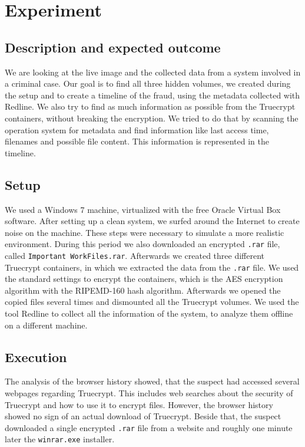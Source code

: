 \section{Experiment}
\subsection{Description and expected outcome}
We are looking at the live image and the collected data from a system involved in a criminal case. 
Our goal is to find all three hidden volumes, we created during the setup and to create a timeline of the fraud, using the metadata collected with Redline. 
We also try to find as much information as possible from the Truecrypt containers, without breaking the encryption. 
We tried to do that by scanning the operation system for metadata and find information like last access time, filenames and possible file content.  
This information is represented in the timeline.

\subsection{Setup}
We used a Windows 7 machine, virtualized with the free Oracle Virtual Box software.
After setting up a clean system, we surfed around the Internet to create noise on the machine. 
These steps were necessary to simulate a more realistic environment.
During this period we also downloaded an encrypted \texttt{.rar} file, called \texttt{Important WorkFiles.rar}.
Afterwards we created three different Truecrypt containers, in which we extracted the data from the \texttt{.rar} file.
We used the standard settings to encrypt the containers, which is the AES encryption algorithm with the RIPEMD-160 hash algorithm.
Afterwards we opened the copied files several times and dismounted all the Truecrypt volumes.
We used the tool Redline to collect all the information of the system, to analyze them offline on a different machine.

\subsection{Execution}
The analysis of the browser history showed, that the suspect had accessed several webpages regarding Truecrypt. 
This includes web searches about the security of Truecrypt and how to use it to encrypt files. 
However, the browser history showed no sign of an actual download of Truecrypt. 
Beside that, the suspect downloaded a single encrypted \texttt{.rar} file from a website and roughly one minute later the \texttt{winrar.exe} installer.


